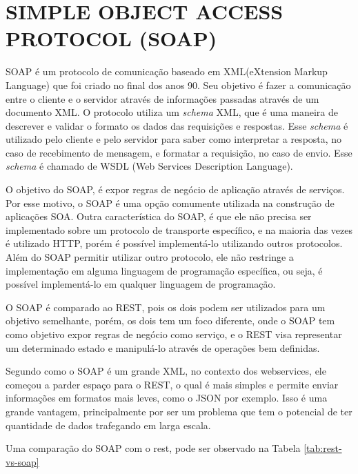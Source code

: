 

\section{SIMPLE OBJECT ACCESS PROTOCOL (SOAP)}
SOAP é um protocolo de comunicação baseado em XML(eXtension Markup Language) que foi criado no final 
dos anos 90. Seu objetivo é fazer a comunicação entre o cliente e o servidor através de informações 
passadas através de um documento XML. O protocolo utiliza um \textit{schema} XML, que é uma 
maneira de descrever e validar o formato os dados das requisições e respostas. 
Esse \textit{schema} é utilizado pelo cliente e pelo servidor para saber como interpretar 
a resposta, no caso de recebimento de mensagem, e formatar a requisição, no caso de envio.
Esse \textit{schema} é chamado de WSDL (Web Services Description Language).

O objetivo do SOAP, é expor regras de negócio de aplicação através de serviços. 
Por esse motivo, o SOAP é uma opção comumente utilizada na construção de aplicações SOA. 
Outra característica do SOAP, é que ele não precisa ser implementado sobre um protocolo de 
transporte específico, e na maioria das vezes é utilizado HTTP, porém é possível implementá-lo
utilizando outros protocolos. Além do SOAP permitir utilizar outro protocolo, 
ele não restringe a implementação em alguma linguagem de programação específica, ou seja,
é possível implementá-lo em qualquer linguagem de programação.

O SOAP é comparado ao REST, pois os dois podem ser utilizados para um objetivo 
semelhante, porém, os dois tem um foco diferente, onde o SOAP tem como objetivo expor regras de negócio 
como serviço, e o REST visa representar um determinado estado e manipulá-lo através de operações 
bem definidas.

Segundo \cite{lecheta} como o SOAP é um grande XML, no contexto dos webservices, ele começou
a parder espaço para o REST, o qual é mais simples 
e permite enviar informações em formatos mais leves, como o JSON por exemplo. 
Isso é uma grande vantagem, principalmente por ser um problema
que tem o potencial de ter quantidade de dados trafegando em larga escala.

Uma comparação do SOAP com o rest, pode ser observado na Tabela \ref{tab:rest-vs-soap}



